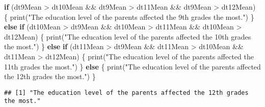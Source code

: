 \documentclass[
]{article}
\newenvironment{Shaded}{\begin{snugshade}}{\end{snugshade}}
\newcommand{\ControlFlowTok}[1]{\textcolor[rgb]{0.13,0.29,0.53}{\textbf{#1}}}
\newcommand{\FunctionTok}[1]{\textcolor[rgb]{0.00,0.00,0.00}{#1}}
\newcommand{\NormalTok}[1]{#1}
\newcommand{\SpecialCharTok}[1]{\textcolor[rgb]{0.00,0.00,0.00}{#1}}
\newcommand{\StringTok}[1]{\textcolor[rgb]{0.31,0.60,0.02}{#1}}
\begin{document}
\begin{Shaded}
\begin{Highlighting}[]
\ControlFlowTok{if}\NormalTok{ (dt9Mean }\SpecialCharTok{\textgreater{}}\NormalTok{ dt10Mean }\SpecialCharTok{\&\&}\NormalTok{ dt9Mean }\SpecialCharTok{\textgreater{}}\NormalTok{ dt11Mean }\SpecialCharTok{\&\&}\NormalTok{ dt9Mean }\SpecialCharTok{\textgreater{}}\NormalTok{ dt12Mean) \{}
  \FunctionTok{print}\NormalTok{(}\StringTok{"The education level of the parents affected the 9th grades the most."}\NormalTok{)}
\NormalTok{\} }\ControlFlowTok{else} \ControlFlowTok{if}\NormalTok{ (dt10Mean }\SpecialCharTok{\textgreater{}}\NormalTok{ dt9Mean }\SpecialCharTok{\&\&}\NormalTok{ dt10Mean }\SpecialCharTok{\textgreater{}}\NormalTok{ dt11Mean }\SpecialCharTok{\&\&}\NormalTok{ dt10Mean }\SpecialCharTok{\textgreater{}}\NormalTok{ dt12Mean) \{}
  \FunctionTok{print}\NormalTok{(}\StringTok{"The education level of the parents affected the 10th grades the most."}\NormalTok{)}
\NormalTok{\} }\ControlFlowTok{else} \ControlFlowTok{if}\NormalTok{ (dt11Mean }\SpecialCharTok{\textgreater{}}\NormalTok{ dt9Mean }\SpecialCharTok{\&\&}\NormalTok{ dt11Mean }\SpecialCharTok{\textgreater{}}\NormalTok{ dt10Mean }\SpecialCharTok{\&\&}\NormalTok{ dt11Mean }\SpecialCharTok{\textgreater{}}\NormalTok{ dt12Mean) \{}
  \FunctionTok{print}\NormalTok{(}\StringTok{"The education level of the parents affected the 11th grades the most."}\NormalTok{)}
\NormalTok{\} }\ControlFlowTok{else}\NormalTok{ \{}
  \FunctionTok{print}\NormalTok{(}\StringTok{"The education level of the parents affected the 12th grades the most."}\NormalTok{)}
\NormalTok{\}}
\end{Highlighting}
\end{Shaded}

\begin{verbatim}
## [1] "The education level of the parents affected the 12th grades the most."
\end{verbatim}
\end{document}
